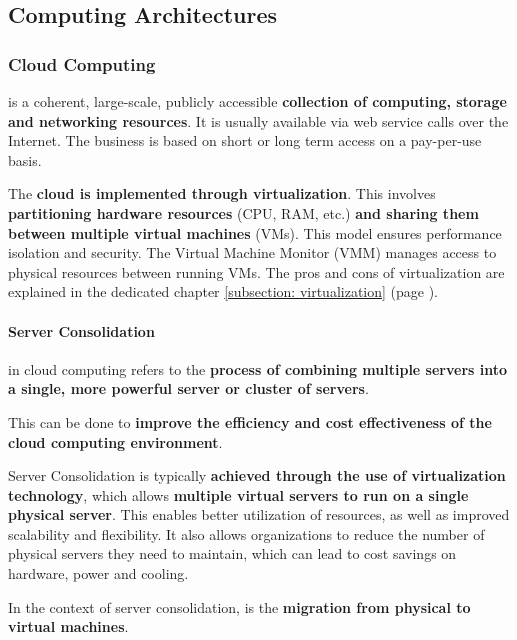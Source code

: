 \subsection{Computing Architectures}

\subsubsection{Cloud Computing}

 is a coherent, large-scale, publicly accessible \textbf{collection of computing, storage and networking resources}. It is usually available via web service calls over the Internet. The business is based on short or long term access on a pay-per-use basis.

\highspace
The \textbf{cloud is implemented through virtualization}. This involves \textbf{partitioning hardware resources} (CPU, RAM, etc.) \textbf{and sharing them between multiple virtual machines} (VMs). This model ensures performance isolation and security. The Virtual Machine Monitor (VMM) manages access to physical resources between running VMs. The pros and cons of virtualization are explained in the dedicated chapter \ref{subsection: virtualization} (page \pageref{subsection: virtualization}).

\longline

\paragraph{Server Consolidation}

 in cloud computing refers to the \textbf{process of combining multiple servers into a single, more powerful server or cluster of servers}.

\highspace
This can be done to \textbf{improve the efficiency and cost effectiveness of the cloud computing environment}.

\highspace
Server Consolidation is typically \textbf{achieved through the use of virtualization technology}, which allows \textbf{multiple virtual servers to run on a single physical server}. This enables better utilization of resources, as well as improved scalability and flexibility. It also allows organizations to reduce the number of physical servers they need to maintain, which can lead to cost savings on hardware, power and cooling. 

\highspace
In the context of server consolidation,  is the \textbf{migration from physical to virtual machines}.

